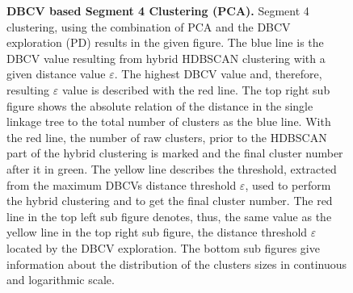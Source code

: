 \begin{figure}[!hbt]
\begin{subfigure}[b]{0.475\textwidth}
    \end{subfigure}
    \caption[\Acrshort{DBCV} based Segment 4 Clustering (\Acrshort{PCA})]{\textbf{\Acrshort{DBCV} based Segment 4 Clustering (\Acrshort{PCA}).} Segment 4 clustering, using the combination of \gls{PCA} and the \gls{DBCV} exploration (PD) results in the given figure. The blue line is the \gls{DBCV} value resulting from hybrid \gls{HDBSCAN} clustering with a given distance value $\varepsilon$. The highest \gls{DBCV} value and, therefore, resulting $\varepsilon$ value is described with the red line. The top right sub figure shows the absolute relation of the distance in the single linkage tree to the total number of clusters as the blue line. With the red line, the number of raw clusters, prior to the \gls{HDBSCAN} part of the hybrid clustering is marked and the final cluster number after it in green. The yellow line describes the threshold, extracted from the maximum \glspl{DBCV} distance threshold $\varepsilon$, used to perform the hybrid clustering and to get the final cluster number. The red line in the top left sub figure denotes, thus, the same value as the yellow line in the top right sub figure, the distance threshold $\varepsilon$ located by the \gls{DBCV} exploration. The bottom sub figures give information about the distribution of the clusters sizes in continuous and logarithmic scale.}
    \label{fig:PCA_Cluster_DBCV_4}
\end{figure}

